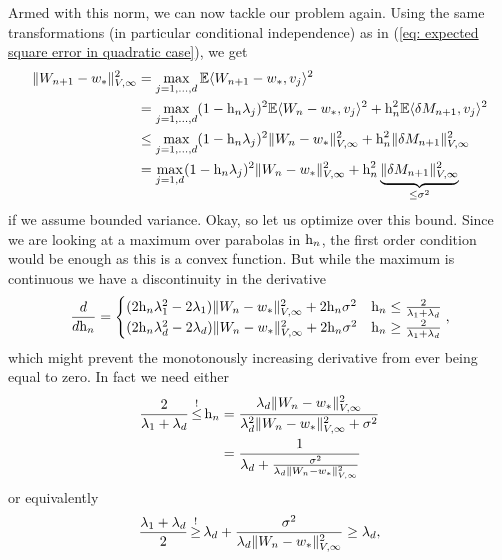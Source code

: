 Armed with this norm, we can now tackle our problem again. Using the same
transformations (in particular conditional independence) as in (\ref{eq:
expected square error in quadratic case}), we get
\begin{align}
	\nonumber
	\|W_{n+1} -w_*\|_{V,\infty}^2
	&= \max_{j=1,\dots,d} \mathbb{E}\langle W_{n+1} -w_*, v_j\rangle^2\\
	\nonumber
	&= \max_{j=1,\dots,d} (1-\text{h}_n\lambda_j)^2\mathbb{E}\langle W_n -w_*, v_j\rangle^2
	+ \text{h}_n^2 \mathbb{E}\langle \delta M_{n+1}, v_j \rangle^2\\
	\nonumber
	&\le \max_{j=1,\dots,d} (1-\text{h}_n\lambda_j)^2\|W_n -w_*\|_{V,\infty}^2
	+ \text{h}_n^2 \|\delta M_{n+1}\|_{V,\infty}^2\\
	\label{eq: upper bound weird norm weight distance}
	&= \max_{j=1,d} (1-\text{h}_n\lambda_j)^2\|W_n -w_*\|_{V,\infty}^2
	+ \text{h}_n^2 \underbrace{\|\delta M_{n+1}\|_{V,\infty}^2}_{\le \sigma^2}
\end{align}
if we assume bounded variance. Okay, so let us optimize over this bound. Since
we are looking at a maximum over parabolas in \(\text{h}_n\), the first order
condition would be enough as this is a convex function. But while the maximum is
continuous we have a discontinuity in the derivative 
\begin{align*}
	\frac{d}{d\text{h}_n}
	= \begin{cases}
	(2\text{h}_n \lambda_1^2 - 2\lambda_1)\|W_n-w_*\|_{V,\infty}^2
	+ 2 \text{h}_n \sigma^2
	& \text{h}_n \le \frac{2}{\lambda_1+\lambda_d}\\
	(2\text{h}_n \lambda_d^2 - 2\lambda_d)\|W_n-w_*\|_{V,\infty}^2
	+ 2 \text{h}_n \sigma^2
	& \text{h}_n \ge \frac{2}{\lambda_1+\lambda_d}
	\end{cases},
\end{align*}
which might prevent the monotonously increasing derivative from ever being equal
to zero. In fact we need either
\begin{align*}
	\frac{2}{\hesseEV_1+\hesseEV_\dimension} \xle{!} \lr_n
	&= \frac{
		\hesseEV_\dimension \|\Weights_n-\minimum\|_{V,\infty}^2
	}{
		\hesseEV_\dimension^2 \|\Weights_n-\minimum\|_{V,\infty}^2 + \stdBound^2
	}\\
	&= \frac{1}{
		\hesseEV_\dimension
		+ \frac{\stdBound^2}{
			\hesseEV_\dimension\|\Weights_n-\minimum\|_{V,\infty}^2
		}
	}
\end{align*}
or equivalently
\begin{align*}
	\frac{\hesseEV_1+\hesseEV_\dimension}{2}
	\xge{!} \hesseEV_\dimension
	+ \frac{\stdBound^2}{
		\hesseEV_\dimension\|\Weights_n-\minimum\|_{V,\infty}^2
	}
	\ge \hesseEV_\dimension,
\end{align*}
